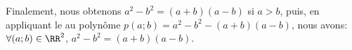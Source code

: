 \begin{example}
Finalement, nous obtenons $a^2 - b^2 = (a+b)(a-b)$ si $a > b$,
puis, 
en appliquant le  au polynôme $p(a ; b) = a^2 - b^2 - (a+b)(a-b)$, 
nous avons:
$\forall (a ; b) \in \RR^2$, $a^2 - b^2 = (a+b)(a-b)$.
\end{example}
